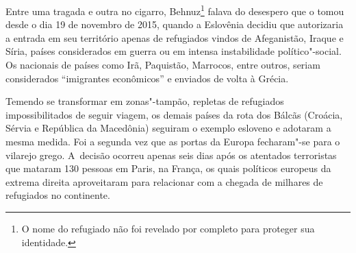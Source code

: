 \mbox{}\pagebreak

\clearpage


 

Entre uma tragada e outra no cigarro, Behnuz\footnote{ O nome do refugiado não foi revelado por completo
para proteger sua identidade.} falava do
desespero que o tomou desde o dia 19 de novembro de 2015, quando a
Eslovênia decidiu que autorizaria a entrada em seu território apenas de
refugiados vindos de Afeganistão, Iraque e Síria, países considerados em
guerra ou em intensa instabilidade político"-social. Os nacionais de
países como Irã, Paquistão, Marrocos, entre outros, seriam considerados
``imigrantes econômicos'' e enviados de volta à Grécia.

Temendo se transformar em zonas"-tampão, repletas de refugiados
impossibilitados de seguir viagem, os demais países da rota dos Bálcãs
(Croácia, Sérvia e República da Macedônia) seguiram o exemplo esloveno e
adotaram a mesma medida. Foi a segunda vez que as portas da Europa
fecharam"-se para o vilarejo grego. A~decisão ocorreu apenas seis dias
após os atentados terroristas que mataram 130 pessoas em Paris, na
França, os quais políticos europeus da extrema direita aproveitaram para
relacionar com a chegada de milhares de refugiados no continente.



